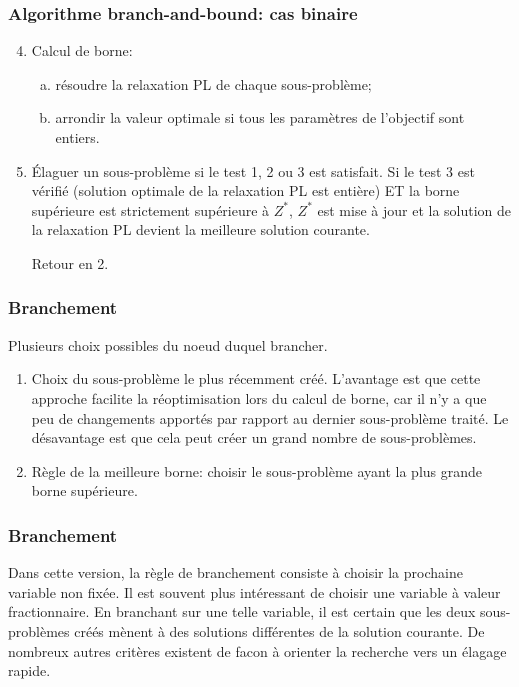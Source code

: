 \documentclass[usepdftitle=false]{beamer}
\begin{document}
\begin{frame}
\frametitle{Algorithme branch-and-bound: cas binaire}

\begin{enumerate}
\setcounter{enumi}{3}
\item
Calcul de borne:
\begin{enumerate}[(a)]
	\item
	résoudre la relaxation PL de chaque sous-problème;
	\item
	arrondir la valeur optimale si tous les paramètres de l'objectif sont entiers.
\end{enumerate}
\item
Élaguer un sous-problème si le test 1, 2 ou 3 est satisfait. Si le test 3 est vérifié (solution optimale de la relaxation PL est entière) ET la borne supérieure est strictement supérieure à $Z^*$, $Z^*$ est mise à jour et la solution de la relaxation PL devient la meilleure solution courante.

Retour en 2.
\end{enumerate}

\end{frame}

\begin{frame}
\frametitle{Branchement}

Plusieurs choix possibles du noeud duquel brancher.

\mbox{}

\begin{enumerate}
	\item 
Choix du sous-problème le plus récemment créé.
L'avantage est que cette approche facilite la réoptimisation lors du calcul de borne, car il n'y a que peu de changements apportés par rapport au dernier sous-problème traité.
Le désavantage est que cela peut créer un grand nombre de sous-problèmes.
	\item 
Règle de la meilleure borne: choisir le sous-problème ayant la plus grande borne supérieure.
\end{enumerate}

\end{frame}

\begin{frame}
\frametitle{Branchement}

Dans cette version, la règle de branchement consiste à choisir la prochaine variable non fixée. Il est souvent plus intéressant de choisir une variable à valeur fractionnaire.
En branchant sur une telle variable, il est certain que les deux sous-problèmes créés mènent à des solutions différentes de la solution courante.
De nombreux autres critères existent de facon à orienter la recherche vers un élagage rapide.

\end{frame}
\end{document}

